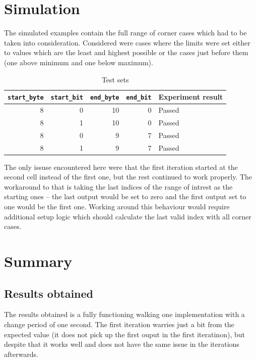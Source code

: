 \documentclass[a4paper, 12pt, titlepage]{article}
\begin{document}
    \section{Simulation}
        The simulated examples contain the full range of corner cases
        which had to be taken into consideration. Considered were
        cases where the limits were set either to values which are the 
        least and highest possible or the cases just before them (one
        above minimum and one below maximum).
        \begin{table}[H]
            \centering
            \caption{Test sets}
            \begin{tabular}{|r|r|r|r|l|} \hline
                \textbf{\texttt{start\_byte}} & \textbf{\texttt{start\_bit}} & 
                \textbf{\texttt{end\_byte}} & \textbf{\texttt{end\_bit}} & 
                Experiment result \\ \hline
                8 & 0 & 10 & 0 & Passed \\ \hline
                8 & 1 & 10 & 0 & Passed \\ \hline
                8 & 0 & 9 & 7 & Passed \\ \hline
                8 & 1 & 9 & 7 & Passed \\ \hline
            \end{tabular}
        \end{table} \noindent
        The only issuse encountered here were that the first iteration
        started at the second cell instead of the first one, but the rest
        continued to work properly. The workaround to that is taking the 
        last indices of the range of intrest as the starting ones -- the 
        last output would be set to zero and the first output set to one
        would be the first one. Working around this behaviour would require
        additional setup logic which should calculate the last valid index
        with all corner cases.
    \section{Summary}
        \subsection{Results obtained}
            The results obtained is a fully functioning walking one implementation
            with a change period of one second. The first iteration warries just 
            a bit from the expected value (it does not pick up the first ouput in
            the first iteratinon), but despite that it works well and does not have
            the same issue in the iterations afterwards.
\end{document}
